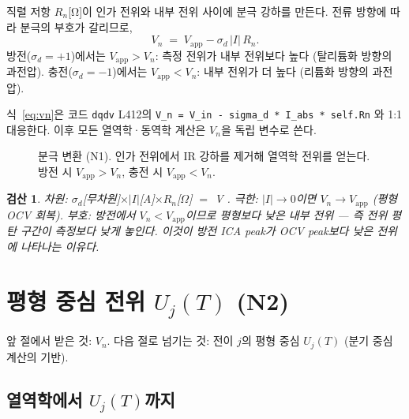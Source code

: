\documentclass[11pt,a4paper]{article}
\newtheorem*{verifybox}{검산}
\newcommand{\app}{\mathrm{app}}
\begin{document}
직렬 저항 $R_n$[Ω]이 인가 전위와 내부 전위 사이에 분극 강하를 만든다.
전류 방향에 따라 분극의 부호가 갈리므로,
\begin{equation}
  \boxed{V_n \;=\; V_\app - \sigma_d\,|I|\,R_n.}
  \label{eq:vn}
\end{equation}
방전($\sigma_d=+1$)에서는 $V_\app > V_n$: 측정 전위가 내부 전위보다 높다
(탈리튬화 방향의 과전압).
충전($\sigma_d=-1$)에서는 $V_\app < V_n$: 내부 전위가 더 높다
(리튬화 방향의 과전압).

식~\eqref{eq:vn}은 코드 \texttt{dqdv} L412의 \texttt{V\_n = V\_in - sigma\_d * I\_abs * self.Rn}
와 1:1 대응한다. 이후 모든 열역학·동역학 계산은 $V_n$을 독립 변수로 쓴다.

\begin{figure}[h]
\centering
{}
\caption{분극 변환 (N1). 인가 전위에서 IR 강하를 제거해 열역학 전위를 얻는다.
방전 시 $V_\app > V_n$, 충전 시 $V_\app < V_n$.}
\label{fig:polar}
\end{figure}

\begin{verifybox}
차원: $\sigma_d$[무차원]$\times|I|$[A]$\times R_n$[$\Omega$] $=$ V \checkmark.
극한: $|I|\to0$이면 $V_n\to V_\app$ (평형 OCV 회복).
부호: 방전에서 $V_n < V_\app$이므로 평형보다 낮은 내부 전위 — 즉 전위 평탄 구간이
측정보다 낮게 놓인다. 이것이 방전 ICA peak가 OCV peak보다 낮은 전위에 나타나는 이유다.
\end{verifybox}

\section{평형 중심 전위 $U_j(T)$ (N2)}
\label{sec:Uj}
앞 절에서 받은 것: $V_n$.
다음 절로 넘기는 것: 전이 $j$의 평형 중심 $U_j(T)$ (분기 중심 계산의 기반).

\subsection{열역학에서 $U_j(T)$까지}
\end{document}
